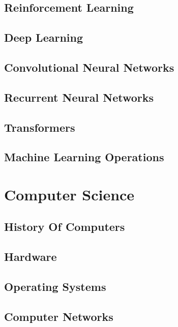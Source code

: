 \documentclass[a4paper, notitlepage]{report}
\begin{document}
\chapter{Reinforcement Learning}


\chapter{Deep Learning}


\chapter{Convolutional Neural Networks}


\chapter{Recurrent Neural Networks}


\chapter{Transformers}


\chapter{Machine Learning Operations}


\part{Computer Science}

\chapter{History Of Computers}


\chapter{Hardware}


\chapter{Operating Systems}


\chapter{Computer Networks}

\end{document}
